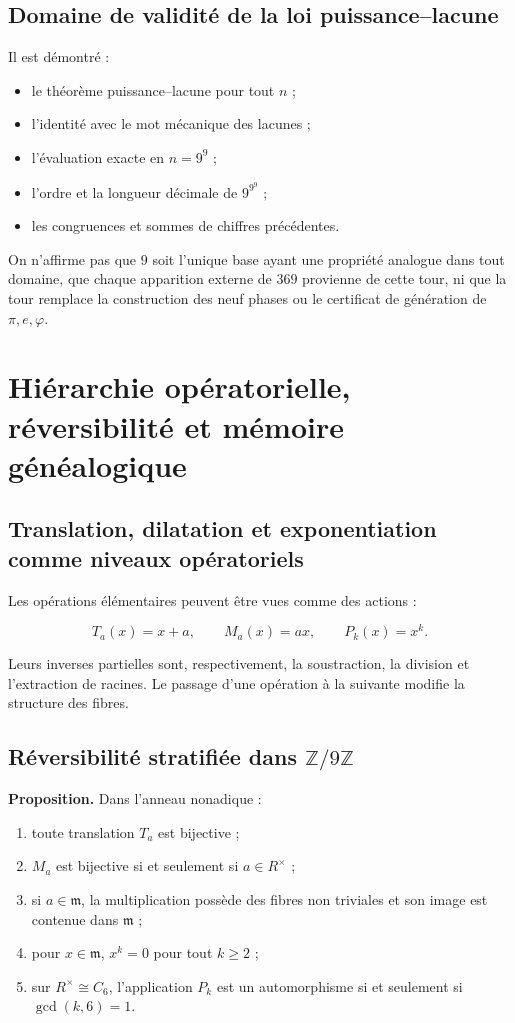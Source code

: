 \subsection{Domaine de validité de la loi puissance--lacune}

Il est démontré :

\begin{itemize}
\item le théorème puissance–lacune pour tout \(n\) ;
\item l’identité avec le mot mécanique des lacunes ;
\item l’évaluation exacte en \(n=9^9\) ;
\item l’ordre et la longueur décimale de \(9^{9^9}\) ;
\item les congruences et sommes de chiffres précédentes.
\end{itemize}

On n’affirme pas que \(9\) soit l’unique base ayant une propriété analogue dans tout domaine, que chaque apparition externe de \(369\) provienne de cette tour, ni que la tour remplace la construction des neuf phases ou le certificat de génération de \(\pi,e,\varphi\).


\section{Hiérarchie opératorielle, réversibilité et mémoire généalogique}

\subsection{Translation, dilatation et exponentiation comme niveaux opératoriels}

Les opérations élémentaires peuvent être vues comme des actions :

\[
T_a(x)=x+a,\qquad
M_a(x)=ax,\qquad
P_k(x)=x^k.
\]

Leurs inverses partielles sont, respectivement, la soustraction, la division et l’extraction de racines. Le passage d’une opération à la suivante modifie la structure des fibres.

\subsection{Réversibilité stratifiée dans \(\mathbb Z/9\mathbb Z\)}

\textbf{Proposition.} Dans l’anneau nonadique :

\begin{enumerate}
\item toute translation \(T_a\) est bijective ;
\item \(M_a\) est bijective si et seulement si \(a\in R^\times\) ;
\item si \(a\in\mathfrak m\), la multiplication possède des fibres non triviales et son image est contenue dans \(\mathfrak m\) ;
\item pour \(x\in\mathfrak m\), \(x^k=0\) pour tout \(k\ge2\) ;
\item sur \(R^\times\cong C_6\), l’application \(P_k\) est un automorphisme si et seulement si \(\gcd(k,6)=1\).
\end{enumerate}

